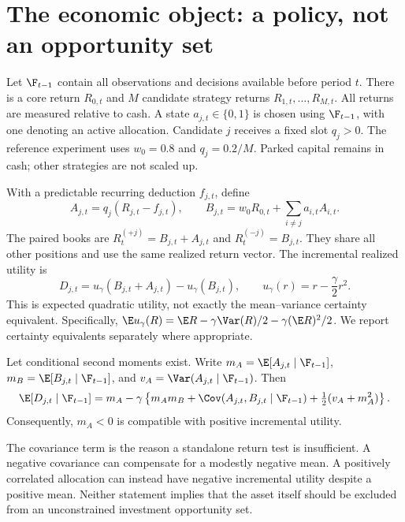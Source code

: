 \section{The economic object: a policy, not an opportunity set}\label{sec:economy}
Let $\F_{t-1}$ contain all observations and decisions available before period $t$. There is a core return $R_{0,t}$ and $M$ candidate strategy returns $R_{1,t},\ldots,R_{M,t}$. All returns are measured relative to cash. A state $a_{j,t}\in\{0,1\}$ is chosen using $\F_{t-1}$, with one denoting an active allocation. Candidate $j$ receives a fixed slot $q_j>0$. The reference experiment uses $w_0=0.8$ and $q_j=0.2/M$. Parked capital remains in cash; other strategies are not scaled up.

With a predictable recurring deduction $f_{j,t}$, define
\begin{equation}
 A_{j,t}=q_j(R_{j,t}-f_{j,t}),\qquad
 B_{j,t}=w_0R_{0,t}+\sum_{i\ne j}a_{i,t}A_{i,t}.
\end{equation}
The paired books are $R^{(+j)}_t=B_{j,t}+A_{j,t}$ and $R^{(-j)}_t=B_{j,t}$. They share all other positions and use the same realized return vector. The incremental realized utility is
\begin{equation}\label{eq:paired}
 D_{j,t}=u_\gamma(B_{j,t}+A_{j,t})-u_\gamma(B_{j,t}),
 \qquad u_\gamma(r)=r-\frac{\gamma}{2}r^2.
\end{equation}
This is expected quadratic utility, not exactly the mean--variance certainty equivalent. Specifically, $\E u_\gamma(R)=\E R-\gamma\Var(R)/2-\gamma(\E R)^2/2$. We report certainty equivalents separately where appropriate.

\begin{proposition}\label{prop:marginal}
Let conditional second moments exist. Write $m_A=\E[A_{j,t}\mid\F_{t-1}]$, $m_B=\E[B_{j,t}\mid\F_{t-1}]$, and $v_A=\Var(A_{j,t}\mid\F_{t-1})$. Then
\begin{equation}\label{eq:conditionalvalue}
 \E[D_{j,t}\mid\F_{t-1}]
 =m_A-\gamma\left\{m_Am_B+\Cov(A_{j,t},B_{j,t}\mid\F_{t-1})
       +\tfrac12(v_A+m_A^2)\right\}.
\end{equation}
Consequently, $m_A<0$ is compatible with positive incremental utility.
\end{proposition}

The covariance term is the reason a standalone return test is insufficient. A negative covariance can compensate for a modestly negative mean. A positively correlated allocation can instead have negative incremental utility despite a positive mean. Neither statement implies that the asset itself should be excluded from an unconstrained investment opportunity set.

